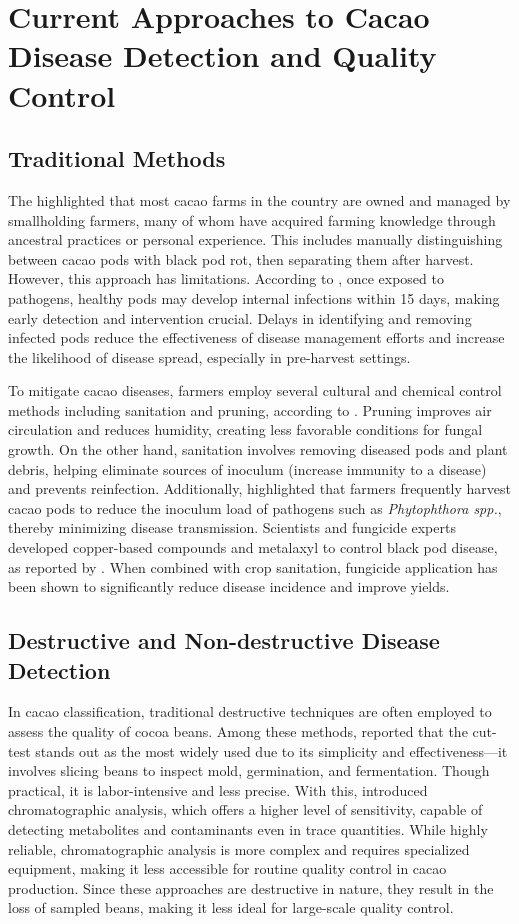 \section{Current Approaches to Cacao Disease Detection and Quality Control}
\subsection*{Traditional Methods}
The \cite{PhilCacaoRoadmap2021} highlighted that most cacao farms in the country are owned and managed by smallholding farmers, many of whom have acquired farming knowledge through ancestral practices or personal experience. This includes manually distinguishing between cacao pods with black pod rot, then separating them after harvest. However, this approach has limitations. According to \cite{ForestPhytophthora}, once exposed to pathogens, healthy pods may develop internal infections within 15 days, making early detection and intervention crucial. Delays in identifying and removing infected pods reduce the effectiveness of disease management efforts and increase the likelihood of disease spread, especially in pre-harvest settings.

To mitigate cacao diseases, farmers employ several cultural and chemical control methods including sanitation and pruning, according to \cite{AceboGuerrero2012}. Pruning improves air circulation and reduces humidity, creating less favorable conditions for fungal growth. On the other hand, sanitation involves removing diseased pods and plant debris, helping eliminate sources of inoculum (increase immunity to a disease) and prevents reinfection. Additionally, \cite{Merga2022} highlighted that farmers frequently harvest cacao pods to reduce the inoculum load of pathogens such as \textit{Phytophthora spp.}, thereby minimizing disease transmission. Scientists and fungicide experts developed copper-based compounds and metalaxyl to control black pod disease, as reported by \cite{Aneani2007}. When combined with crop sanitation, fungicide application has been shown to significantly reduce disease incidence and improve yields.

\subsection*{Destructive and Non-destructive Disease Detection}
In cacao classification, traditional destructive techniques are often employed to assess the quality of cocoa beans. Among these methods, \cite{Nguyen2022} reported that the cut-test stands out as the most widely used due to its simplicity and effectiveness—it involves slicing beans to inspect mold, germination, and fermentation. Though practical, it is labor-intensive and less precise. With this, \cite{Quelal2020} introduced chromatographic analysis, which offers a higher level of sensitivity, capable of detecting metabolites and contaminants even in trace quantities. While highly reliable, chromatographic analysis is more complex and requires specialized equipment, making it less accessible for routine quality control in cacao production. Since these approaches are destructive in nature, they result in the loss of sampled beans, making it less ideal for large-scale quality control.

